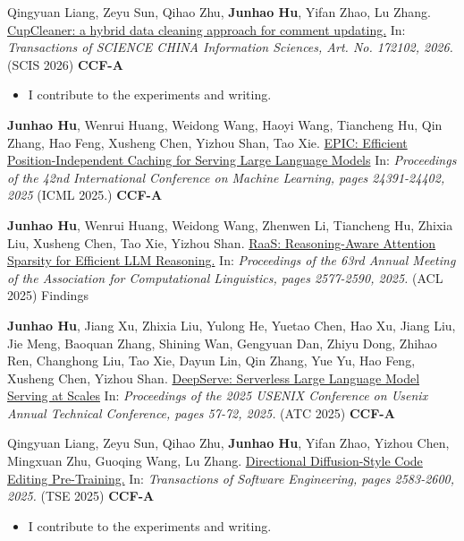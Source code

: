 \begin{enumerate}[label={[\arabic*]}]
    \item Qingyuan Liang, Zeyu Sun, Qihao Zhu, \textbf{Junhao Hu}, Yifan Zhao, Lu Zhang. \href{https://www.sciengine.com/SCIS/articleIndex?doi=10.1007/s11432-024-4637-2&scroll=}{\color{cyan} CupCleaner: a hybrid data cleaning approach for comment updating.} In: \textit{Transactions of SCIENCE CHINA Information Sciences, Art. No. 172102, 2026.} (SCIS 2026) \textbf{CCF-A}
    \begin{itemize}
        \item I contribute to the experiments and writing.
    \end{itemize}
    

    \item \textbf{Junhao Hu}, Wenrui Huang, Weidong Wang, Haoyi Wang, Tiancheng Hu, Qin Zhang, Hao Feng, Xusheng Chen, Yizhou Shan, Tao Xie. \href{https://proceedings.mlr.press/v267/hu25j.html}{\color{cyan} EPIC: Efficient Position-Independent Caching for Serving Large Language Models} In: \textit{Proceedings of the 42nd International Conference on Machine Learning, pages 24391-24402, 2025} (ICML 2025.) \textbf{CCF-A}

    \item \textbf{Junhao Hu}, Wenrui Huang, Weidong Wang, Zhenwen Li, Tiancheng Hu, Zhixia Liu, Xusheng Chen, Tao Xie, Yizhou Shan. \href{https://aclanthology.org/2025.findings-acl.131.pdf}{\color{cyan} RaaS: Reasoning-Aware Attention Sparsity for Efficient LLM Reasoning.} In: \textit{Proceedings of the 63rd Annual Meeting of the Association for Computational Linguistics, pages 2577-2590, 2025.} (ACL 2025) Findings
    
    \item \textbf{Junhao Hu}, Jiang Xu, Zhixia Liu, Yulong He, Yuetao Chen, Hao Xu, Jiang Liu, Jie Meng, Baoquan Zhang, Shining Wan, Gengyuan Dan, Zhiyu Dong, Zhihao Ren, Changhong Liu, Tao Xie, Dayun Lin, Qin Zhang, Yue Yu, Hao Feng, Xusheng Chen, Yizhou Shan. \href{https://www.usenix.org/system/files/atc25-hu-junhao.pdf}{\color{cyan} DeepServe: Serverless Large Language Model Serving at Scales} In: \textit{Proceedings of the 2025 USENIX Conference on Usenix Annual Technical Conference, pages 57-72, 2025.} (ATC 2025) \textbf{CCF-A}

    \item Qingyuan Liang, Zeyu Sun, Qihao Zhu, \textbf{Junhao Hu}, Yifan Zhao, Yizhou Chen, Mingxuan Zhu, Guoqing Wang, Lu Zhang. \href{https://ieeexplore.ieee.org/stamp/stamp.jsp?arnumber=11096907}{\color{cyan} Directional Diffusion-Style Code Editing Pre-Training.} In: \textit{Transactions of Software Engineering, pages 2583-2600, 2025.} (TSE 2025) \textbf{CCF-A}
    \begin{itemize}
        \item I contribute to the experiments and writing.
    \end{itemize}



\end{enumerate}
